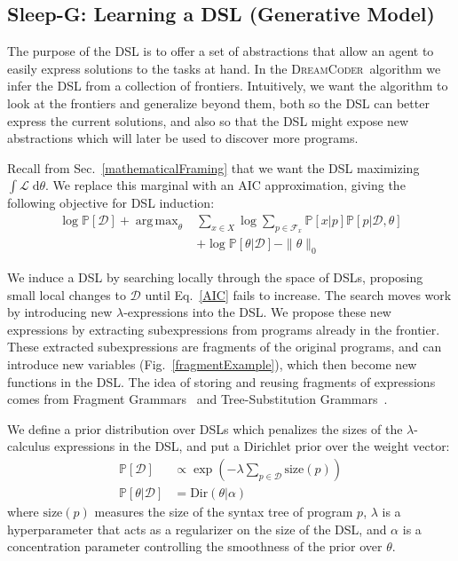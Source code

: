 \documentclass{article}
\newcommand{\system}{\textsc{DreamCoder}~}
\newcommand{\lowerBound}{\mathscr{L}}
\DeclareMathOperator*{\argmax}{arg\,max} %
\newcommand{\probability}{\mathds{P}} %
\begin{document}
\subsection{Sleep-G: Learning a DSL (Generative Model)}\label{grammarInductionSection}

The purpose of the DSL is to
offer a set of abstractions
that allow an agent to easily express solutions to the tasks at hand.
In the \system algorithm we infer the DSL from a collection of frontiers.
Intuitively, we want the algorithm to
look at  the frontiers and
generalize beyond them, 
both so the DSL can better express the current solutions,
and  also so that the DSL might expose new abstractions
which will later be used to
discover more programs.

Recall from Sec.~\ref{mathematicalFraming} that we want the DSL maximizing $\int \lowerBound\;\mathrm{d}\theta$.
We replace this marginal with an AIC approximation, giving the following objective for DSL induction:
\begin{align}
  \nonumber
    \log \probability[\mathcal{D}] + \argmax_{\theta}&\sum_{x\in X}\log \sum_{p\in \mathcal{F}_x}\probability[x|p]\probability[p|\mathcal{D},\theta]\\
  &+ \log \probability[\theta|\mathcal{D}] - \|\theta\|_0 \label{AIC}
  \end{align}

We induce a DSL by searching locally through the space of DSLs,
proposing small local changes to $\mathcal{D}$ until Eq.~\ref{AIC} fails to increase.
The search moves work by introducing new
$\lambda$-expressions into the DSL.
We propose these new expressions by extracting subexpressions from
programs already in the frontier.
These extracted subexpressions
are fragments of the original programs, and can introduce new variables (Fig.~\ref{fragmentExample}),
which then become new functions in the DSL.
The idea of storing and reusing
fragments of expressions comes from Fragment Grammars~\cite{tim} and Tree-Substitution Grammars~\cite{cohn2010inducing}.



We define a prior distribution over DSLs which penalizes the sizes of the $\lambda$-calculus expressions in the DSL, and put a Dirichlet prior over the weight vector:
\begin{align}
  \probability[\mathcal{D}]&\propto\exp\left(-\lambda\sum_{p\in \mathcal{D}}\text{size}(p) \right)\\
  \probability[\theta|\mathcal{D}]& = \text{Dir}(\theta|\alpha)
\end{align}
where $\text{size}(p)$  measures the size of the syntax tree of program $p$,
$\lambda$ is a hyperparameter that acts as a regularizer on the size of the DSL,
and $\alpha$ is a concentration parameter controlling the smoothness of the prior over $\theta$.
\end{document}
